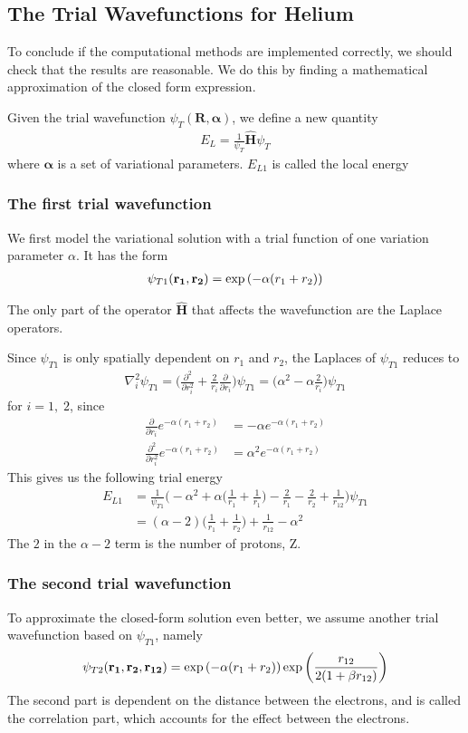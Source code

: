 \documentclass[twocolumns, a4paper,11pt,fleqn]{extarticle}
\newcommand{\eq}[1]{{\small\begin{align*}#1\end{align*}}}
\renewcommand\vec[1]{\boldsymbol{\mathbf{#1}}}
\newcommand{\OP}[1]{\mathbf{\widehat{#1}}}
\begin{document}
\subsection{The Trial Wavefunctions for Helium}

To conclude if the computational methods are implemented correctly,
we should check that the results are reasonable. We do this by
finding a mathematical approximation of the closed form expression.

Given the trial wavefunction $\psi_T (\vec R, \boldsymbol\alpha)$, 
we define a new quantity
{\small
\eq{
  E_L = \frac{1}{\psi_T}\OP H \psi_T
}}%
where $\boldsymbol\alpha$ is a set of variational parameters.
$E_{L1}$ is called the local energy

\subsubsection{The first trial wavefunction}
We first model the variational solution with a trial function of one
variation parameter $\alpha$. It has the form
{\small
\eq{
\psi_{T1}({\bf r_1},{\bf r_2}) = 
   \exp{\left(-\alpha(r_1+r_2)\right)}
}}%

The only part of the operator $\OP H$ that affects the wavefunction
are the Laplace operators.

Since $\psi_{T1}$ is only spatially dependent on $r_1$ and $r_2$,
the Laplaces of $\psi_{T1}$ reduces to
{\small
\eq{
  \nabla_i^2 \psi_{T1} = \bigg( \frac{\partial^2}{\partial r_i^2} 
    + \frac{2}{r_i} \frac{\partial}{\partial r_i} \bigg) \psi_{T1}
    = \bigg( \alpha^2 -\alpha\frac{2}{r_i}  \bigg)\psi_{T1}
}}%
for $i = 1,\;2$, since
{\small
\eq{
  \frac{\partial}{\partial r_i} e^{-\alpha (r_1+r_2)}
    &= -\alpha e^{-\alpha (r_1+r_2)}\\
\frac{\partial^2}{\partial r_i^2} e^{-\alpha (r_1+r_2)}
    &= \alpha^2 e^{-\alpha (r_1+r_2)}
}}%
This gives us the following trial energy
{\small
\eq{
  E_{L1}&=\frac{1}{\psi_{T1}}\bigg( -\alpha^2 
  +\alpha\bigg( \frac{1}{r_1}+\frac{1}{r_1}  \bigg)
    -\frac{2}{r_1}-\frac{2}{r_2} + \frac{1}{r_{12}}
    \bigg)\psi_{T1}\\
  &=(\alpha-2)\bigg( \frac{1}{r_1}+\frac{1}{r_2} \bigg)
    +\frac{1}{r_{12}}-\alpha^2
}}%
The $2$ in the $\alpha-2$ term is the number of protons, Z.

\subsubsection{The second trial wavefunction}
To approximate the closed-form solution even better,
we assume another trial wavefunction based on $\psi_{T1}$, namely
{\small
\eq{
  \psi_{T2} ({\bf r_1},{\bf r_2}, {\bf r_{12}})
    =\exp{\left(-\alpha(r_1+r_2)\right)}
    \exp{\left(\frac{r_{12}}{2(1+\beta r_{12})}\right)}
}}%
The second part is dependent on the distance between the
electrons, and is called the correlation part,
which accounts for the effect between the electrons.
\end{document}
